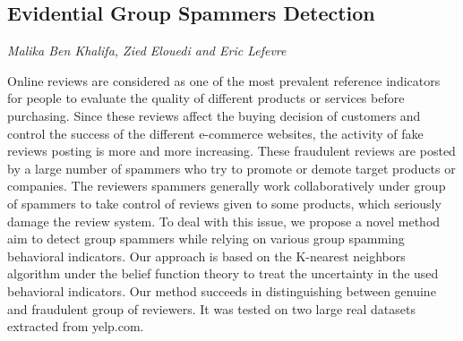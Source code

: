 \documentclass[../booklet.tex]{subfiles}
\begin{document}
\subsection[Evidential Group Spammers Detection. {\it Malika Ben Khalifa, Zied Elouedi and Eric Lefevre}]{Evidential Group Spammers Detection}
  

\begin{center}
  {\it Malika Ben Khalifa, Zied Elouedi and Eric Lefevre}
\end{center}



\emph{}
Online reviews are considered as one of the most prevalent reference indicators for people to evaluate the quality of different products or services before purchasing. Since these reviews affect the buying decision of customers and control the success of the different e-commerce websites, the activity of fake reviews posting is more and more increasing. These fraudulent reviews are posted by a large number of spammers who try to promote or demote target products or companies. The reviewers spammers generally work collaboratively under group of spammers to take control of reviews given to some products, which seriously damage the review system. To deal with this issue, we propose a novel method aim to detect group spammers while relying on various group spamming behavioral indicators. Our approach is based on the K-nearest neighbors algorithm under the belief function theory to treat the uncertainty in the used behavioral indicators. Our method succeeds in distinguishing between genuine and fraudulent group of reviewers. It was tested on two large real datasets extracted from yelp.com.

\end{document}
